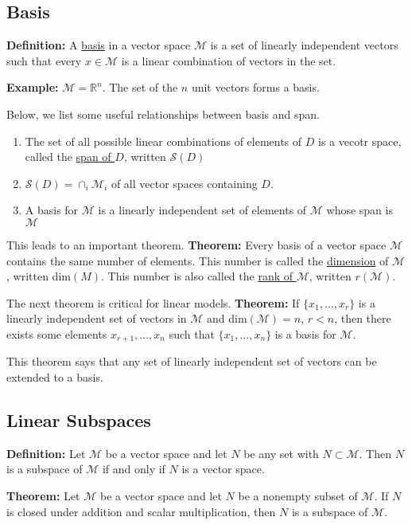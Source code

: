 \documentclass[12pt]{article}
\numberwithin{equation}{section}
\begin{document}
\subsection{Basis}
\textbf{Definition:} A \underline{basis} in a vector space $\mathcal{M}$ is a set of linearly independent vectors such that every $x \in \mathcal{M}$ is a linear combination of vectors in the set.

\textbf{Example:} $\mathcal{M} = \mathbb{R}^n$. The set of the $n$ unit vectors forms a basis.

Below, we list some useful relationships between basis and span.

\begin{enumerate}
  \item The set of all possible linear combinations of elements of $D$ is a vecotr space, called the \underline{span of $D$}, written $\mathcal{S}(D)$
  \item $\mathcal{S}(D) = \cap_i \mathcal{M}_i$ of all vector spaces containing $D$.
  \item A basis for $\mathcal{M}$ is a linearly independent set of elements of $\mathcal{M}$ whose span is $\mathcal{M}$
\end{enumerate}

This leads to an important theorem.
\textbf{Theorem:} Every basis of a vector space $\mathcal{M}$ contains the same number of elements. This number is called the \underline{dimension} of $\mathcal{M}$, written dim$(M)$. This number is also called the \underline{rank of $\mathcal{M}$}, written $r(\mathcal{M})$.

The next theorem is critical for linear models.
\textbf{Theorem:} If $\{x_1, \ldots, x_r\}$ is a linearly independent set of vectors in $\mathcal{M}$ and dim$(\mathcal{M}) = n$, $r < n$, then there exists some elements $x_{r+1}, \ldots, x_n$ such that $\{x_1, \ldots, x_n\}$ is a basis for $\mathcal{M}$.

This theorem says that any set of linearly independent set of vectors can be extended to a basis.

\subsection{Linear Subspaces}
\textbf{Definition:} Let $\mathcal{M}$ be a vector space and let $N$ be any set with $N \subset \mathcal{M}$. Then $N$ is a subspace of $\mathcal{M}$ if and only if $N$ is a vector space.

\textbf{Theorem:} Let $\mathcal{M}$ be a vector space and let $N$ be a nonempty subset of $\mathcal{M}$. If $N$ is closed under addition and scalar multiplication, then $N$ is a subspace of $\mathcal{M}$.
\end{document}
